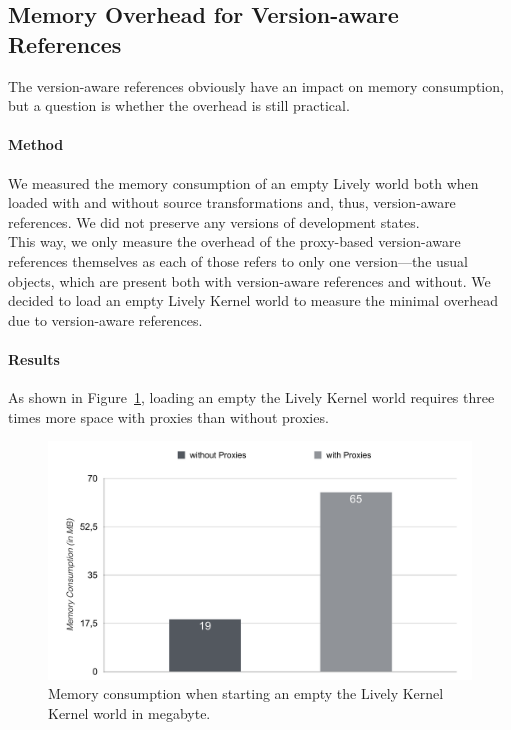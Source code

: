 \subsection{Memory Overhead for Version-aware References}

The version-aware references obviously have an impact on memory consumption, but a question is whether the overhead is still practical.

\paragraph{Method}
We measured the memory consumption of an empty Lively world both when loaded with and without source transformations and, thus, version-aware references.
We did not preserve any versions of development states.\\
This way, we only measure the overhead of the proxy-based version-aware references themselves as each of those refers to only one version---the usual objects, which are present both with version-aware references and without.
We decided to load an empty Lively Kernel world to measure the minimal overhead due to version-aware references.


\paragraph{Results}
As shown in Figure~\ref{fig:MemoryOverheadForReferences}, loading an empty the Lively Kernel world requires three times more space with proxies than without proxies.

\begin{figure}[h]
    \centering
    \includegraphics[width=\textwidth]{figures/6_evaluation/1_memoryOverhead.pdf}
    \caption{Memory consumption when starting an empty the Lively Kernel Kernel world in megabyte.}
    \label{fig:MemoryOverheadForReferences}
\end{figure}

